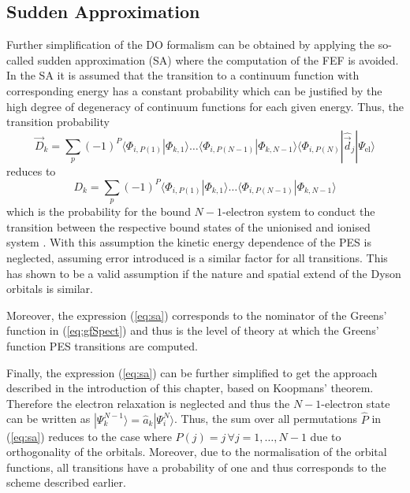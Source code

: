 \subsection{Sudden Approximation}
\label{ch:sa}
Further simplification of the DO formalism can be obtained by applying the so-called sudden approximation (SA) where the computation of the FEF is avoided.
In the SA it is assumed that the transition to a continuum function with corresponding energy has a constant probability which can be justified by the high degree of degeneracy of continuum functions for each given energy.
Thus, the transition probability
\begin{equation}
\vec{D}_k= \sum_p (-1)^P \langle \Phi_{i,P(1)}  |\Phi_{k,1} \rangle
           \hdots  \langle \Phi_{i,P(N-1)}|\Phi_{k,N-1} \rangle
                   \langle \Phi_{i,P(N)}  |\hat{\vec{d}}_j |\Psi_\text{el}\rangle 
\end{equation}
reduces to 
\begin{equation} \label{eq:sa}
D_k= \sum_p (-1)^P \langle \Phi_{i,P(1)}  |\Phi_{k,1} \rangle
           \hdots  \langle \Phi_{i,P(N-1)}|\Phi_{k,N-1} \rangle
\end{equation}
which is the probability for the bound $N-1$-electron system to conduct the transition between the respective bound states of the unionised and ionised system \cite{saAberg}.
With this assumption the kinetic energy dependence of the PES is neglected, assuming error introduced is a similar factor for all transitions.
This has shown to be a valid assumption if the nature and spatial extend of the Dyson orbitals is similar.

Moreover, the expression (\ref{eq:sa}) corresponds to the nominator of the Greens' function in (\ref{eq:gfSpect}) and thus is the level of theory at which the Greens' function PES transitions are computed.

Finally, the expression (\ref{eq:sa}) can be further simplified to get the approach described in the introduction of this chapter, based on Koopmans' theorem.
Therefore the electron relaxation is neglected and thus the $N-1$-electron state can be written as $|\Psi_{k}^{N-1}\rangle= \hat{a}_k|\Psi_i^N\rangle$. 
Thus, the sum over all permutations $\hat{P}$ in (\ref{eq:sa}) reduces to the case where $P(j)=j\,\forall j=1,\hdots,N-1$ due to orthogonality of the orbitals.
Moreover, due to the normalisation of the orbital functions, all transitions have a probability of one and thus corresponds to the scheme described earlier.
